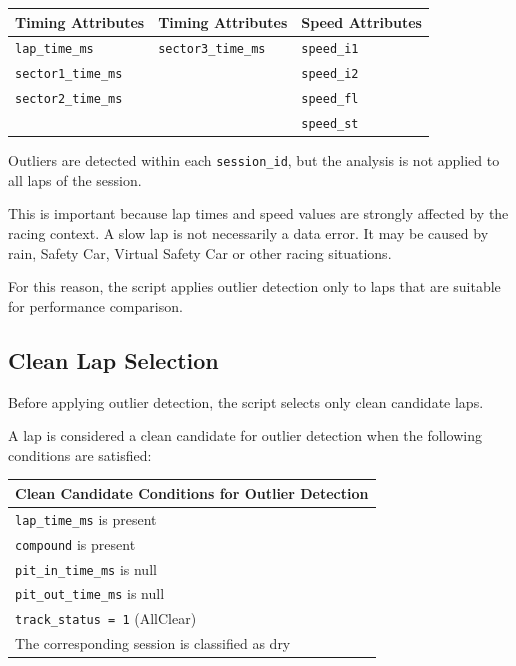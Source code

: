 \documentclass[a4paper,11pt]{article}
\begin{document}
	\begin{table}[H]
		\centering
		\small
		\begin{tabular}{p{4cm}p{4cm}p{4cm}}
			\toprule
			\textbf{Timing Attributes} & \textbf{Timing Attributes} & \textbf{Speed Attributes} \\
			\midrule
			\texttt{lap\_time\_ms}     & \texttt{sector3\_time\_ms} & \texttt{speed\_i1} \\
			\texttt{sector1\_time\_ms} &                         & \texttt{speed\_i2} \\
			\texttt{sector2\_time\_ms} &                         & \texttt{speed\_fl} \\
			&                         & \texttt{speed\_st} \\
			\bottomrule
		\end{tabular}
	\end{table}
	
	Outliers are detected within each \texttt{session\_id}, but the analysis is not
	applied to all laps of the session.
	
	This is important because lap times and speed values are strongly affected by the
	racing context. A slow lap is not necessarily a data error. It may be caused by
	rain, Safety Car, Virtual Safety Car or other racing situations.
	
	For this reason, the script applies outlier detection only to laps that are suitable
	for performance comparison.
	
	\subsection{Clean Lap Selection}
	
	Before applying outlier detection, the script selects only clean candidate laps.
	
	A lap is considered a clean candidate for outlier detection when the following
	conditions are satisfied:
	
	\begin{table}[H]
		\centering
		\small
		\begin{tabular}{p{12cm}}
			\toprule
			\textbf{Clean Candidate Conditions for Outlier Detection} \\
			\midrule
			\texttt{lap\_time\_ms} is present \\[0.1cm]
			\texttt{compound} is present \\[0.1cm]
			\texttt{pit\_in\_time\_ms} is null \\[0.1cm]
			\texttt{pit\_out\_time\_ms} is null \\[0.1cm]
			\texttt{track\_status = 1} (AllClear) \\[0.1cm]
			The corresponding session is classified as dry \\
			\bottomrule
		\end{tabular}
	\end{table}
	
\end{document}
